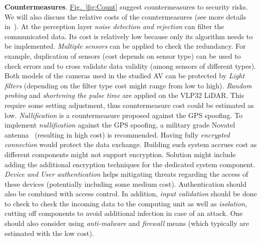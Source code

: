 \documentclass[runningheads]{llncs}
\begin{document}
\textbf{Countermeasures}. \hyperref[fig:Count]{Fig.~\ref{fig:Count}} suggest countermeasures to security risks. We will also discuss the relative costs of the countermeasures (see more details in~\cite{Rando2020}). At the perception layer \textit{noise detection and rejection} can filter the communicated data. Its cost is relatively low because only its algorithm needs to be implemented. \textit{Multiple sensors} can be applied to check the redundancy. For example, duplication of sensors (cost depends on sensor type) can be used to check errors and to cross validate data validity (among sensors of different types). Both models of the cameras used in the studied AV can be protected by \textit{Light filters} (depending on the filter type cost might range from low to high). \textit{Random probing} and \textit{shortening the pulse time} are applied on the VLP32 LiDAR. This require some setting adjustment, thus countermeasure cost could be estimated as low.  \textit{Nullification} is a countermeasure proposed against the GPS spoofing. To implement \textit{nullification} against the GPS spoofing, a military grade Novatel antenna~ (resulting in high cost) is recommended. Having fully \textit{encrypted connection} would protect the data exchange. Building such system accrues cost as different components might not support encryption. Solution might include adding the additional encryption techniques for the dedicated system component. \textit{Device and User authentication} helps mitigating threats regarding the access of these devices (potentially including some medium cost). Authentication should also be combined with access control. In addition, \textit{input validation} should be done to check to check the incoming data to the computing unit as well as \textit{isolation}, cutting off components to avoid additional infection in case of an attack. One should also consider using \textit{anti-malware} and \textit{firewall} means (which typically are estimated with the low cost). %
\end{document}
